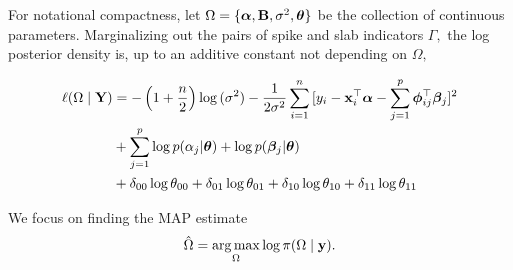 For notational compactness, let $\Omega = \{\boldsymbol{\alpha}, \mathbf{B}, \sigma^{2}, \boldsymbol{\theta}\}$ be the collection of continuous parameters. 
Marginalizing out the pairs of spike and slab indicators $\Gamma,$ the log posterior density is, up to an additive constant not depending on $\Omega,$

\begin{align*}
\begin{split}
\label{eq:log_posterior}
\ell(\Omega \mid \mathbf{Y}) &= -\left(1 + \frac{n}{2}\right)\log{(\sigma^{2})} - \frac{1}{2\sigma^{2}}\sum_{i = 1}^{n}{[y_{i} - \mathbf{x}_{i}^{\top}\boldsymbol{\alpha} - \sum_{j = 1}^{p}{\boldsymbol{\phi}_{ij}^{\top}\boldsymbol{\beta}_{j}}]^{2}} \\
&+ \sum_{j = 1}^{p}{\log{p(\alpha_{j} \vert \boldsymbol{\theta})} + \log{p(\boldsymbol{\beta}_{j} \vert \boldsymbol{\theta})}} \\
&+ \delta_{00}\log{\theta_{00}} + \delta_{01}\log{\theta_{01}} + \delta_{10}\log{\theta_{10}} + \delta_{11}\log{\theta_{11}}
\end{split}
\end{align*}


\begin{comment}
\begin{align*}
\label{eq:log_posterior}
\begin{split}
\ell(\Omega \mid \bY) &= -\left(1 + \frac{n}{2}\right)\log{(\sigma^{2})} - \frac{1}{2\sigma^{2}}\sum_{i = 1}^{n}{[y_{i} - \bx_{i}^{\top}\balpha - \sum_{j = 1}^{p}{\bphi_{ij}^{\top}\bbeta_{j}}]^{2}} \\
& + \sum_{j = 1}^{p}{[(\theta_{10} + \theta_{11})\log{\Psi_{L}(\alpha_{j};\lambda_{1})} + (\theta_{01} + \theta_{00})\log{\Psi_{L}(\alpha_{j};\lambda_{0})}]} \\
&+ \sum_{j = 1}^{p}{[(\theta_{01} + \theta_{11})\log{\Psi_{GL}(\bbeta_{j};\xi_{1})} + (\theta_{10} + \theta_{00})\log{\Psi_{GL}(\bbeta_{j}; \xi_{0})}]} \\
&+ \log{p(\theta)}
\end{split}
\end{align*}
\end{comment}
We focus on finding the MAP estimate
$$
\hat{\Omega} = \operatorname*{arg\,max}_{\Omega}{\log \pi(\Omega \mid \mathbf{y})}.
$$

